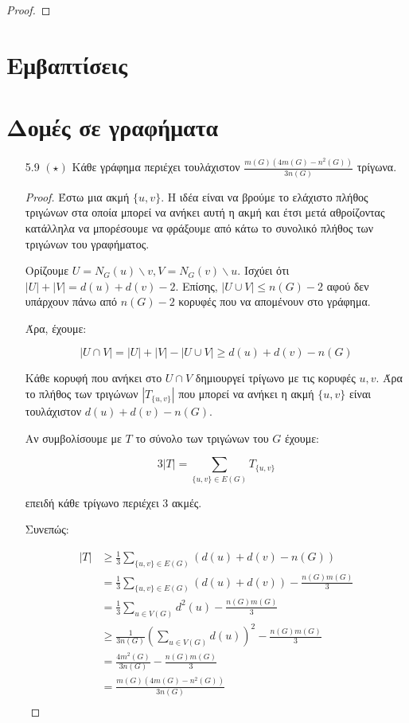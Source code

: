 \documentclass[a4paper, oneside, 11pt]{article}
\begin{document}
\begin{enumerate}
\begin{proof}
\end{proof}

\end{enumerate}
\section{Εμβαπτίσεις}
\section{Δομές σε γραφήματα}

\begin{enumerate}
   \item[5.9 $(\star)$]
      Κάθε γράφημα περιέχει τουλάχιστον $\frac{m(G)(4m(G) - n^2(G))}{3n(G)}$
      τρίγωνα.

      \begin{proof}

      Έστω μια ακμή $\{u, v\}$. Η ιδέα είναι να βρούμε το ελάχιστο πλήθος
      τριγώνων στα οποία μπορεί να ανήκει αυτή η ακμή και έτσι μετά αθροίζοντας
      κατάλληλα να μπορέσουμε να φράξουμε από κάτω το συνολικό πλήθος των
      τριγώνων του γραφήματος.

      Ορίζουμε $U = N_G(u) \backslash v,
      V = N_G(v) \backslash u$. Ισχύει ότι $|U| + |V| = d(u) + d(v) - 2$.
      Επίσης, $|U \cup V| \leq n(G) - 2$ αφού δεν υπάρχουν πάνω από
      $n(G)-2$ κορυφές που να απομένουν στο γράφημα.

      Άρα, έχουμε:

      \[ |U \cap V| = |U| + |V| - |U \cup V| \geq d(u) + d(v) - n(G) \]

      Κάθε κορυφή που ανήκει στο $U \cap V$ δημιουργεί τρίγωνο με τις
      κορυφές $u, v$. Άρα το πλήθος των τριγώνων $|T_{\{u, v\}}|$ που μπορεί
      να ανήκει
      η ακμή $\{u, v\}$ είναι τουλάχιστον $d(u) + d(v) - n(G)$.

      Αν συμβολίσουμε με $T$ το σύνολο των τριγώνων του $G$ έχουμε:

      \[ 3|T| = \sum_{\{u, v\} \in E(G)} T_{\{u, v\}} \]

      επειδή κάθε τρίγωνο περιέχει 3 ακμές.

      Συνεπώς:

      \begin{align*}
         |T| &\geq \frac13 \sum_{\{u, v\} \in E(G)} ( d(u) + d(v) - n(G) )\\
             &= \frac13 \sum_{\{u, v\} \in E(G)} ( d(u) + d(v) ) -
                \frac{n(G)m(G)}3 \\
             &= \frac13 \sum_{u \in V(G)} d^2(u) - \frac{n(G)m(G)}3\\
             &\geq \frac1{3n(G)} \left( \sum_{u \in V(G)} d(u) \right)^2
                 - \frac{n(G)m(G)}3\\
             &= \frac{4m^2(G)}{3n(G)} - \frac{n(G)m(G)}3\\
             &= \frac{m(G)(4m(G) - n^2(G))}{3n(G)}\\
      \end{align*}


\end{proof}
\end{enumerate}
\end{document}
